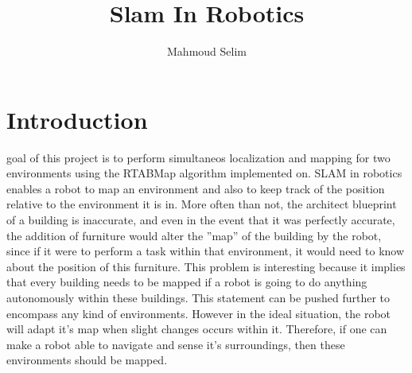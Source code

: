 \documentclass[10pt,journal,compsoc]{IEEEtran}
\begin{document}
\title{Slam In Robotics}

\author{Mahmoud Selim}

%
{}


\maketitle
\IEEEdisplaynontitleabstractindextext
\IEEEpeerreviewmaketitle
\section{Introduction}
\label{sec:introduction}

 goal of this project is to perform simultaneos localization and mapping for two environments using the RTABMap algorithm implemented on. SLAM in
robotics enables a robot to map an environment and also to keep track of the position relative to the environment it
is in.
More often than not, the architect blueprint of a building
is inaccurate, and even in the event that it was perfectly
accurate, the addition of furniture would alter the ”map” of
the building by the robot, since if it were to perform a task
within that environment, it would need to know about the
position of this furniture.
This problem is interesting because it implies that every building needs to be mapped if a robot is going to do anything
autonomously within these buildings. This statement can be pushed further to
encompass any kind of environments. However in the ideal situation, the 
robot will adapt it's map when slight changes occurs within it.
Therefore, if one can make a robot able to navigate and
sense it's surroundings, then these environments should be mapped.
\end{document}
